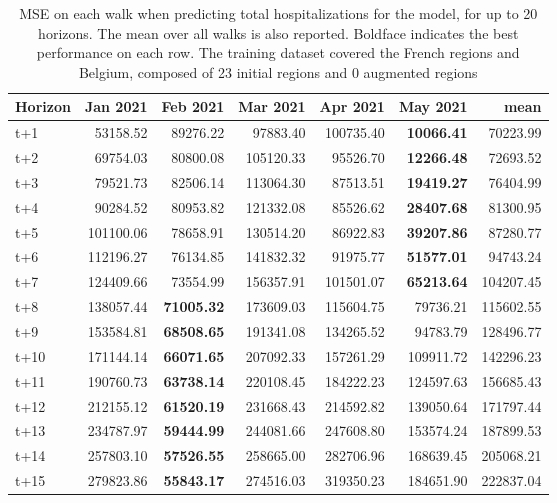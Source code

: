 \begin{table}[H]
\centering
\caption{MSE on each walk when predicting total hospitalizations for the model, for up to 20 horizons. The mean over all walks is also reported. Boldface indicates the best performance on each row. The training dataset covered the French regions and Belgium, composed of 23 initial regions and 0 augmented regions }
\label{tab:MSE_walk_encoder_decoder}
\begin{tabular}{lrrrrrr}
\toprule
Horizon &  Jan 2021 &  Feb 2021 &  Mar 2021 &  Apr 2021 &  May 2021 &      mean \\
\midrule
t+1  & 53158.52  & 89276.22  & 97883.40  & 100735.40  & \textbf{10066.41}  & 70223.99  \\
t+2  & 69754.03  & 80800.08  & 105120.33  & 95526.70  & \textbf{12266.48}  & 72693.52  \\
t+3  & 79521.73  & 82506.14  & 113064.30  & 87513.51  & \textbf{19419.27}  & 76404.99  \\
t+4  & 90284.52  & 80953.82  & 121332.08  & 85526.62  & \textbf{28407.68}  & 81300.95  \\
t+5  & 101100.06  & 78658.91  & 130514.20  & 86922.83  & \textbf{39207.86}  & 87280.77  \\
t+6  & 112196.27  & 76134.85  & 141832.32  & 91975.77  & \textbf{51577.01}  & 94743.24  \\
t+7  & 124409.66  & 73554.99  & 156357.91  & 101501.07  & \textbf{65213.64}  & 104207.45  \\
t+8  & 138057.44  & \textbf{71005.32}  & 173609.03  & 115604.75  & 79736.21  & 115602.55  \\
t+9  & 153584.81  & \textbf{68508.65}  & 191341.08  & 134265.52  & 94783.79  & 128496.77  \\
t+10  & 171144.14  & \textbf{66071.65}  & 207092.33  & 157261.29  & 109911.72  & 142296.23  \\
t+11  & 190760.73  & \textbf{63738.14}  & 220108.45  & 184222.23  & 124597.63  & 156685.43  \\
t+12  & 212155.12  & \textbf{61520.19}  & 231668.43  & 214592.82  & 139050.64  & 171797.44  \\
t+13  & 234787.97  & \textbf{59444.99}  & 244081.66  & 247608.80  & 153574.24  & 187899.53  \\
t+14  & 257803.10  & \textbf{57526.55}  & 258665.00  & 282706.96  & 168639.45  & 205068.21  \\
t+15  & 279823.86  & \textbf{55843.17}  & 274516.03  & 319350.23  & 184651.90  & 222837.04  \\

\end{tabular}
\end{table}

